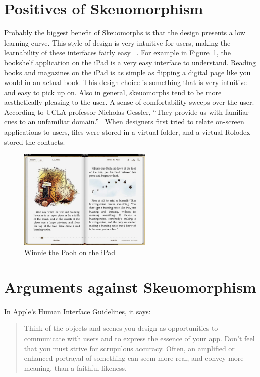 \documentclass{article}
\begin{document}
\section{Positives of Skeuomorphism}

Probably the biggest benefit of Skeuomorphs is that the design presents a low learning curve. This style of design is very intuitive for users, making the learnability of these interfaces fairly easy ~\cite{Former-UI}. For example in Figure~\ref{book}, the bookshelf application on the iPad is a very easy interface to understand. Reading books and magazines on the iPad is as simple as flipping a digital page like you would in an actual book. This design choice is something that is very intuitive and easy to pick up on. Also in general, skeuomorphs tend to be more aesthetically pleasing to the user. A sense of comfortability sweeps over the user. According to UCLA professor Nicholas Gessler, “They provide us with familiar cues to an unfamiliar domain.”~\cite{Gessler} When designers first tried to relate on-screen applications to users, files were stored in a virtual folder, and a virtual Rolodex stored the contacts. ~\cite{FastCompany3}
\begin{figure}
\centering
\includegraphics[width=2.5in]{ipadBook.jpeg} 

\caption{Winnie the Pooh on the iPad}
\label{book}
\end{figure}
\section{Arguments against Skeuomorphism}

In Apple’s Human Interface Guidelines, it says:

\begin{quote}Think of the objects and scenes you design as opportunities to communicate with users and to express the essence of your app. Don't feel that you must strive for scrupulous accuracy. Often, an amplified or enhanced portrayal of something can seem more real, and convey more meaning, than a faithful likeness.\end{quote}
\end{document}
